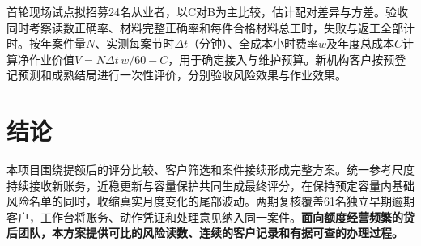 首轮现场试点拟招募24名从业者，以C对B为主比较，估计配对差异与方差。验收同时考察读数正确率、材料完整正确率和每件合格材料总工时，失败与返工全部计时。按年案件量$N$、实测每案节时$\Delta t$（分钟）、全成本小时费率$w$及年度总成本$C$计算净作业价值$V=N\Delta t\,w/60-C$，用于确定接入与维护预算。新机构客户按预登记预测和成熟结局进行一次性评价，分别验收风险效果与作业效果。

\section{结论}
本项目围绕提额后的评分比较、客户筛选和案件接续形成完整方案。统一参考尺度持续接收新账务，近稳更新与容量保护共同生成最终评分，在保持预定容量内基础风险名单的同时，收缩真实月度变化的尾部波动。两期复核覆盖61名独立早期逾期客户，工作台将账务、动作凭证和处理意见纳入同一案件。\textbf{面向额度经营频繁的贷后团队，本方案提供可比的风险读数、连续的客户记录和有据可查的办理过程。}
\label{bodyend}
